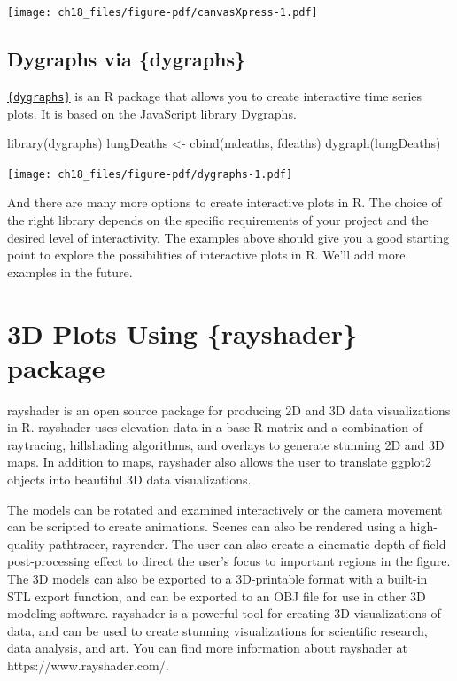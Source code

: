 \documentclass[
  letterpaper,
]{scrbook}
\newenvironment{Shaded}{\begin{snugshade}}{\end{snugshade}}
\newcommand{\FunctionTok}[1]{\textcolor[rgb]{0.28,0.35,0.67}{#1}}
\newcommand{\NormalTok}[1]{\textcolor[rgb]{0.00,0.23,0.31}{#1}}
\newcommand{\OtherTok}[1]{\textcolor[rgb]{0.00,0.23,0.31}{#1}}
\begin{document}
\texttt{[image: ch18\_files/figure-pdf/canvasXpress-1.pdf]}

\section{Dygraphs via \{dygraphs\}}\label{dygraphs-via-dygraphs}

\href{https://rstudio.github.io/dygraphs/}{\texttt{\{dygraphs\}}} is an
R package that allows you to create interactive time series plots. It is
based on the JavaScript library \href{https://dygraphs.com/}{Dygraphs}.

\begin{Shaded}
\begin{Highlighting}[]
\FunctionTok{library}\NormalTok{(dygraphs)}
\NormalTok{lungDeaths }\OtherTok{\textless{}{-}} \FunctionTok{cbind}\NormalTok{(mdeaths, fdeaths)}
\FunctionTok{dygraph}\NormalTok{(lungDeaths)}
\end{Highlighting}
\end{Shaded}

\texttt{[image: ch18\_files/figure-pdf/dygraphs-1.pdf]}

And there are many more options to create interactive plots in R. The
choice of the right library depends on the specific requirements of your
project and the desired level of interactivity. The examples above
should give you a good starting point to explore the possibilities of
interactive plots in R. We'll add more examples in the future.


\chapter{3D Plots Using \{rayshader\}
package}\label{d-plots-using-rayshader-package}

rayshader is an open source package for producing 2D and 3D data
visualizations in R. rayshader uses elevation data in a base R matrix
and a combination of raytracing, hillshading algorithms, and overlays to
generate stunning 2D and 3D maps. In addition to maps, rayshader also
allows the user to translate ggplot2 objects into beautiful 3D data
visualizations.

The models can be rotated and examined interactively or the camera
movement can be scripted to create animations. Scenes can also be
rendered using a high-quality pathtracer, rayrender. The user can also
create a cinematic depth of field post-processing effect to direct the
user's focus to important regions in the figure. The 3D models can also
be exported to a 3D-printable format with a built-in STL export
function, and can be exported to an OBJ file for use in other 3D
modeling software. rayshader is a powerful tool for creating 3D
visualizations of data, and can be used to create stunning
visualizations for scientific research, data analysis, and art. You can
find more information about rayshader at https://www.rayshader.com/.
\end{document}
